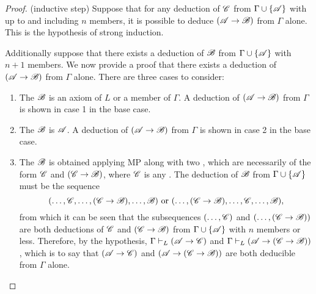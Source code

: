 \begin{proposition}
\begin{proof}
    (inductive step) Suppose that for any deduction of \(\mathscr{C}\) from \(\Gamma \cup \{\mathscr{A}\}\) with up to and including \(n\) members, it is possible to deduce \((\mathscr{A} \rightarrow \mathscr{B})\) from \(\Gamma\) alone. This is the hypothesis of strong induction.

    Additionally suppose that there exists a deduction of \(\mathscr{B}\) from \(\Gamma \cup \{\mathscr{A}\}\) with \(n + 1\) members. We now provide a proof that there exists a deduction of \((\mathscr{A} \rightarrow \mathscr{B})\) from \(\Gamma\) alone. There are three cases to consider:

    \begin{enumerate}
      \item The \wf{} \(\mathscr{B}\) is an axiom of \(L\) or a member of \(\Gamma\). A deduction of \((\mathscr{A} \rightarrow \mathscr{B})\) from \(\Gamma\) is shown in case 1 in the base case.

      \item The \wf{} \(\mathscr{B}\) is \(\mathscr{A}\). A deduction of \((\mathscr{A} \rightarrow \mathscr{B})\) from \(\Gamma\) is shown in case 2 in the base case.

      \item The \wf{} \(\mathscr{B}\) is obtained applying MP along with two \wfs{}, which are necessarily of the form \(\mathscr{C}\) and \((\mathscr{C} \rightarrow \mathscr{B})\), where \(\mathscr{C}\) is any \wf{}. The deduction of \(\mathscr{B}\) from \(\Gamma \cup \{\mathscr{A}\}\) must be the sequence
        \[(\dots, \mathscr{C}, \dots, (\mathscr{C} \rightarrow \mathscr{B}), \dots, \mathscr{B}) \text{ or } (\dots, (\mathscr{C} \rightarrow \mathscr{B}), \dots, \mathscr{C}, \dots, \mathscr{B}),\]
      from which it can be seen that the subsequences \((\dots, \mathscr{C})\) and \((\dots, (\mathscr{C} \rightarrow \mathscr{B}))\) are both deductions of \(\mathscr{C}\) and \((\mathscr{C} \rightarrow \mathscr{B})\) from \(\Gamma \cup \{\mathscr{A}\}\) with \(n\) members or less. Therefore, by the hypothesis, \(\Gamma \vdash_{L} (\mathscr{A} \rightarrow \mathscr{C})\) and \(\Gamma \vdash_{L} (\mathscr{A} \rightarrow (\mathscr{C} \rightarrow \mathscr{B}))\), which is to say that \((\mathscr{A} \rightarrow \mathscr{C})\) and \((\mathscr{A} \rightarrow (\mathscr{C} \rightarrow \mathscr{B}))\) are both deducible from \(\Gamma\) alone.


\end{enumerate}
\end{proof}
\end{proposition}
